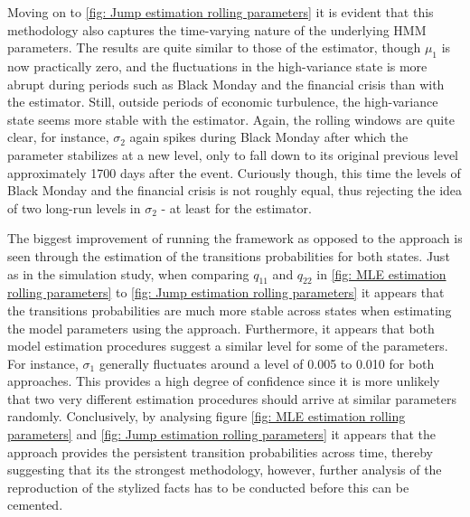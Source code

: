Moving on to \cref{fig: Jump estimation rolling parameters} it is evident that this methodology also captures the time-varying nature of the underlying HMM parameters. The results are quite similar to those of the \mle estimator, though $\mu_1$ is now practically zero, and the fluctuations in the high-variance state is more abrupt during periods such as Black Monday and the financial crisis than with the \mle estimator. Still, outside periods of economic turbulence, the high-variance state seems more stable with the \jump estimator. Again, the rolling windows are quite clear, for instance, $\sigma_2$ again spikes during Black Monday after which the parameter stabilizes at a new level, only to fall down to its original previous level approximately 1700 days after the event. Curiously though, this time the levels of Black Monday and the financial crisis is not roughly equal, thus rejecting the idea of two long-run levels in $\sigma_2$ - at least for the \jump estimator. 

The biggest improvement of running the \jump framework as opposed to the \mle approach is seen through the estimation of the transitions probabilities for both states. Just as in the simulation study, when comparing $q_{11}$ and $q_{22}$ in \cref{fig: MLE estimation rolling parameters} to \cref{fig: Jump estimation rolling parameters} it appears that the transitions probabilities are much more stable across states when estimating the model parameters using the \jump approach. Furthermore, it appears that both model estimation procedures suggest a similar level for some of the parameters. For instance, $\sigma_1$ generally fluctuates around a level of 0.005 to 0.010 for both approaches. This provides a high degree of confidence since it is more unlikely that two very different estimation procedures should arrive at similar parameters randomly. Conclusively, by analysing figure \ref{fig: MLE estimation rolling parameters} and \ref{fig: Jump estimation rolling parameters} it appears that the \jump approach provides the persistent transition probabilities across time, thereby suggesting that its the strongest methodology, however, further analysis of the reproduction of the stylized facts has to be conducted before this can be cemented.

